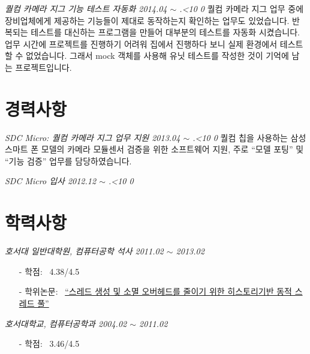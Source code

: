 \documentclass[line,margin]{res}
\renewcommand{\today}{\number\year.\ifnum\number\month<10 0\fi \number\month}
\begin{document}
\begin{resume}
  {\sl 퀄컴 카메라 지그 기능 테스트 자동화 \hfill 2014.04 $\sim$ \today}
  \vspace{1mm}
  \newline
  {
    \small
    퀄컴 카메라 지그 업무 중에 장비업체에게 제공하는 기능들이 제대로 동작하는지 확인하는 업무도 있었습니다.
    반복되는 테스트를 대신하는 프로그램을 만들어 대부분의 테스트를 자동화 시켰습니다.
    업무 시간에 프로젝트를 진행하기 어려워 집에서 진행하다 보니 실제 환경에서 테스트 할 수 없었습니다.
    그래서 mock 객체를 사용해 유닛 테스트를 작성한 것이 기억에 남는 프로젝트입니다.
  }


  \section{경력사항}

  {\sl SDC Micro: 퀄컴 카메라 지그 업무 지원 \hfill 2013.04 $\sim$ \today}
  \vspace{1mm}
  \newline
  {
    \small
    퀄컴 칩을 사용하는 삼성 스마트 폰 모델의 카메라 모듈센서 검증을 위한 소프트웨어 지원,
    주로 ``모델 포팅'' 및 ``기능 검증'' 업무를 담당하였습니다.
  }

  {\sl SDC Micro 입사 \hfill 2012.12 $\sim$ \today}
  \vspace{0mm}


  \section{학력사항}

  {\sl 호서대 일반대학원, 컴퓨터공학 석사 \hfill 2011.02 $\sim$ 2013.02}
  \vspace{-4mm}
  {
    \small
    \begin{itemize}
    \item[-] 학점: ~4.38/4.5 \vspace{-1mm}
    \item[-] 학위논문: ~\href{http://dlibrary.hoseo.ac.kr/search/DetailView.ax?sid=4&cid=950591}
      {``스레드 생성 및 소멸 오버헤드를 줄이기 위한 히스토리기반 동적 스레드 풀''}
    \end{itemize}
  }

  {\sl 호서대학교, 컴퓨터공학과 \hfill 2004.02 $\sim$ 2011.02}
  \vspace{-4mm}
  {
    \small
    \begin{itemize}
    \item[-] 학점: ~3.46/4.5
    \end{itemize}
  }


\end{resume}

\end{document}
